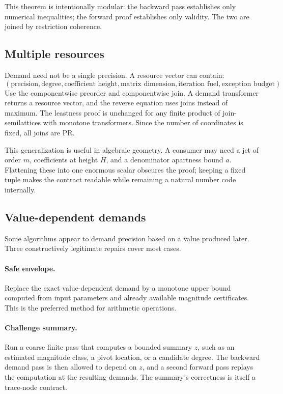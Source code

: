 This theorem is intentionally modular: the backward pass establishes only
numerical inequalities; the forward proof establishes only validity.  The two
are joined by restriction coherence.

\subsection{Multiple resources}

Demand need not be a single precision.  A resource vector can contain:
\[
 (\text{precision},\text{degree},\text{coefficient height},
   \text{matrix dimension},\text{iteration fuel},\text{exception budget}).
\]
Use the componentwise preorder and componentwise join.  A demand transformer
returns a resource vector, and the reverse equation uses joins instead of
maximum.  The leastness proof is unchanged for any finite product of
join-semilattices with monotone transformers.  Since the number of coordinates
is fixed, all joins are PR.

This generalization is useful in algebraic geometry.  A consumer may need a
jet of order \(m\), coefficients at height \(H\), and a denominator apartness
bound \(a\).  Flattening these into one enormous scalar obscures the proof;
keeping a fixed tuple makes the contract readable while remaining a natural
number code internally.

\subsection{Value-dependent demands}

Some algorithms appear to demand precision based on a value produced later.
Three constructively legitimate repairs cover most cases.

\paragraph{Safe envelope.}
Replace the exact value-dependent demand by a monotone upper bound computed
from input parameters and already available magnitude certificates.  This is
the preferred method for arithmetic operations.

\paragraph{Challenge summary.}
Run a coarse finite pass that computes a bounded summary \(z\), such as an
estimated magnitude class, a pivot location, or a candidate degree.  The
backward demand pass is then allowed to depend on \(z\), and a second forward
pass replays the computation at the resulting demands.  The summary's
correctness is itself a trace-node contract.

